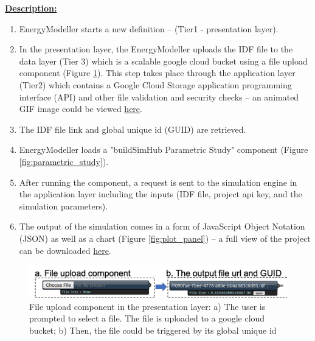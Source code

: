 \documentclass{scsSimAUDPaperFormat}
\begin{document}
\textbf{\underline{Description: }}
\begin{enumerate}
    \item EnergyModeller starts a new definition -- (Tier1 - presentation layer).
    \item In the presentation layer, the EnergyModeller uploads the IDF file to the data layer (Tier 3) which is a scalable google cloud bucket using a file upload component (Figure \ref{fig:fileupload_comp}). This step takes place through the application layer (Tier2) which contains a Google Cloud Storage application programming interface (API) and other file validation and security checks -- an animated GIF image could be viewed \href{https://user-images.githubusercontent.com/6969514/77833649-16c24280-717a-11ea-9df1-8a5e0f7bae83.gif}{here}.
    \item The IDF file link and global unique id (GUID) are retrieved. 
    \item EnergyModeller loads a "buildSimHub Parametric Study" component (Figure \ref{fig:parametric_study}). 
    \item After running the component, a request is sent to the simulation engine in the application layer including the inputs (IDF file, project api key, and the simulation parameters). 
    \item The output of the simulation comes in a form of JavaScript Object Notation (JSON) as well as a chart (Figure \ref{fig:plot_panel}) -- a full view of the project can be downloaded \href{https://user-images.githubusercontent.com/6969514/77868854-2ff8eb00-726f-11ea-837d-efedac7a80a5.png}{ here}. 
\end{enumerate}

\begin{figure}[h]
\includegraphics[width=\columnwidth]{paper_LateX/imgs/file_compo.png}
\caption{ File upload component in the presentation layer: a) The user is prompted to select a file. The file is uploaded to a google cloud bucket; b) Then, the file could be triggered by its global unique id}
\label{fig:fileupload_comp}
\end{figure}
\end{document}
